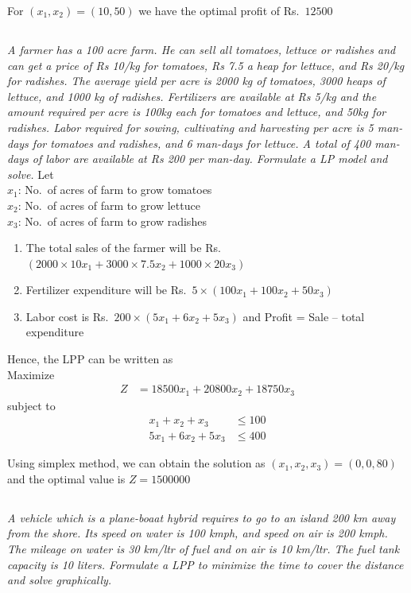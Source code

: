 \documentclass[12pt]{article}
\begin{document}
For $\left(x_1,x_2\right) = \left(10, 50\right)$ we have the optimal profit of Rs.~$12500$

\subsection{}
\emph{A farmer has a 100 acre farm. He can sell all tomatoes, lettuce or radishes and can get a price of Rs 10/kg for tomatoes, 
Rs 7.5 a heap for lettuce, and Rs 20/kg for radishes. The average yield per acre is 2000 kg of tomatoes, 3000 heaps of lettuce, 
and 1000 kg of radishes. Fertilizers are available at Rs 5/kg and the amount required per acre is 100kg each for tomatoes and lettuce, 
and 50kg for radishes. Labor required for sowing, cultivating and harvesting per acre is 5 man-days for tomatoes and radishes, and 
6 man-days for lettuce. A total of 400 man-days of labor are available at Rs 200 per man-day. Formulate a LP model and solve.}
Let\\
$x_1$: No.~of acres of farm to grow tomatoes\\
$x_2$: No.~of acres of farm to grow lettuce\\
$x_3$: No.~of acres of farm to grow radishes\\
\begin{enumerate}
\item The total sales of the farmer will be Rs.~$\left(2000\times 10x_1 + 3000\times 7.5x_2 + 1000\times 20x_3\right)$
\item Fertilizer expenditure will be Rs.~$5\times\left(100x_1+100x_2+50x_3\right)$
\item Labor cost is Rs.~$200\times\left(5x_1+6x_2+5x_3\right)$ and Profit = Sale -- total expenditure
\end{enumerate}

Hence, the LPP can be written as\\
Maximize
\begin{align*}
  Z &= 18500x_1 + 20800x_2 + 18750x_3
\end{align*}
subject to
\begin{align*}
  x_1+x_2+x_3 &\le 100 \tag{total area is 100 acres} \\
  5x_1+6x_2+5x_3 &\le 400 \tag{total man-days is 400}
\end{align*}

Using simplex method, we can obtain the solution as $\left(x_1,x_2,x_3\right) = \left(0,0,80\right)$ and the optimal value is $Z=1500000$

\subsection{}
\emph{A vehicle which is a plane-boaat hybrid requires to go to an island 200 km away from the shore. Its speed on water is 100 kmph, 
and speed on air is 200 kmph. The mileage on water is 30 km/ltr of fuel and on air is 10 km/ltr. The fuel tank capacity is 10 liters. 
Formulate a LPP to minimize the time to cover the distance and solve graphically.}
\end{document}
